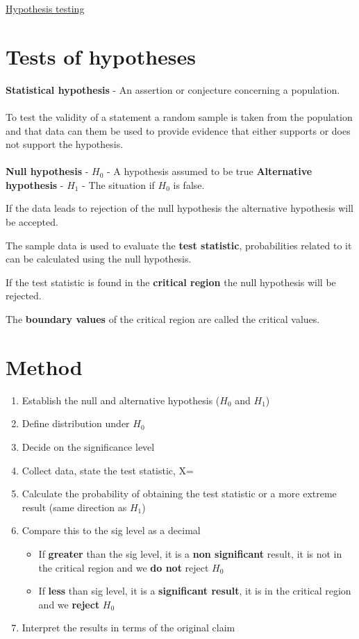 \documentclass{article}[18pt]
\begin{document}
\begin{center}
\underline{\huge Hypothesis testing}
\end{center}
\section{Tests of hypotheses}
\textbf{Statistical hypothesis} - An assertion or conjecture concerning a population.\\
\\
To test the validity of a statement a random sample is taken from the population and that data can them be used to provide evidence that either supports or does not support the hypothesis.\\
\\
\textbf{Null hypothesis} - $H_0$ - A hypothesis assumed to be true
\textbf{Alternative hypothesis} - $H_1$ - The situation if $H_0$ is false.

If the data leads to rejection of the null hypothesis the alternative hypothesis will be accepted.

The sample data is used to evaluate the \textbf{test statistic}, probabilities related to it can be calculated using the null hypothesis.

If the test statistic is found in the \textbf{critical region} the null hypothesis will be rejected.

The \textbf{boundary values} of the critical region are called the critical values.
\section{Method}
\begin{enumerate}
\item Establish the null and alternative hypothesis ($H_0$ and $H_1$)
\item Define distribution under $H_0$
\item Decide on the significance level
\item Collect data, state the test statistic, X=
\item Calculate the probability of obtaining the test statistic or a more extreme result (same direction as $H_1$)
\item Compare this to the sig level as a decimal
\begin{itemize}
\item If \textbf{greater} than the sig level, it is a \textbf{non significant} result, it is not in the critical region and we \textbf{do not} reject $H_0$
\item If \textbf{less} than sig level, it is a \textbf{significant result}, it is in the critical region and we \textbf{reject} $H_0$ 
\end{itemize}
\item Interpret the results in terms of the original claim
\end{enumerate}
\end{document}
